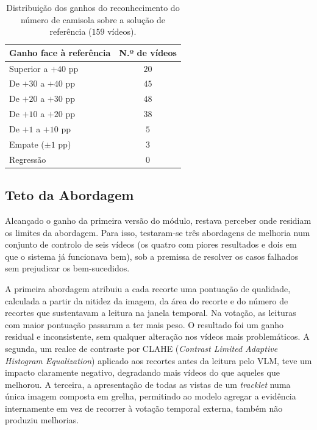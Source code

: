 \begin{table}[htbp]
    \centering
    \caption{Distribuição dos ganhos do reconhecimento do número de camisola sobre a solução de
    referência ($159$ vídeos).}
    \label{tab:jnr-distribuicao}
    \begin{tabular}{|l|c|}
        \hline
        \textbf{Ganho face à referência} & \textbf{N.º de vídeos} \\
        \hline
        Superior a $+40$ pp & $20$ \\
        \hline
        De $+30$ a $+40$ pp & $45$ \\
        \hline
        De $+20$ a $+30$ pp & $48$ \\
        \hline
        De $+10$ a $+20$ pp & $38$ \\
        \hline
        De $+1$ a $+10$ pp  & $5$ \\
        \hline
        Empate ($\pm 1$ pp) & $3$ \\
        \hline
        Regressão           & $0$ \\
        \hline
    \end{tabular}
\end{table}


\subsection{Teto da Abordagem}\label{sec:res_jnr_teto}

Alcançado o ganho da primeira versão do módulo, restava perceber onde residiam os limites da
abordagem. Para isso, testaram-se
três abordagens de melhoria num conjunto de controlo de seis vídeos (os quatro com piores resultados
e dois em que o sistema já funcionava bem), sob a premissa de resolver os casos falhados sem
prejudicar os bem-sucedidos.

A primeira abordagem atribuiu a cada recorte uma pontuação de qualidade, calculada a partir da nitidez
da imagem, da área do recorte e do número de recortes que sustentavam a leitura na janela temporal.
Na votação, as leituras com maior pontuação passaram a ter mais peso. O resultado foi um ganho
residual e inconsistente, sem qualquer alteração nos vídeos mais problemáticos. A segunda, um realce
de contraste por CLAHE (\emph{Contrast Limited Adaptive Histogram Equalization}) aplicado aos
recortes antes da leitura pelo VLM, teve um impacto claramente negativo, degradando mais vídeos do
que aqueles que melhorou. A terceira, a apresentação de todas as vistas de um \emph{tracklet} numa
única imagem composta em grelha, permitindo ao modelo agregar a evidência internamente em vez de
recorrer à votação temporal externa, também não produziu melhorias.

